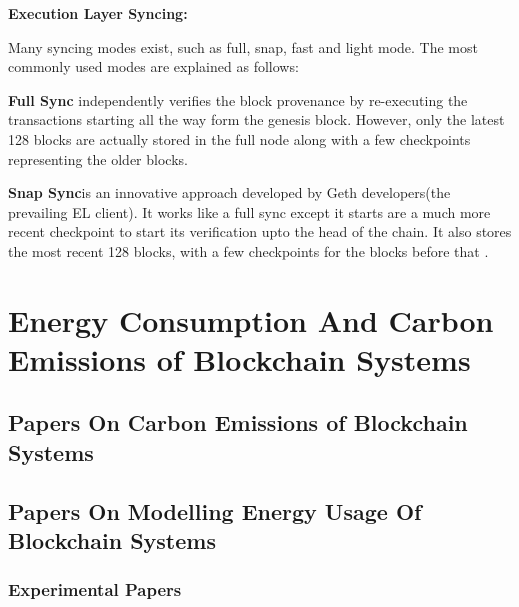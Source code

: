 \textbf{Execution Layer Syncing: } 

Many syncing modes exist, such as full, snap, fast and light mode. The most commonly used modes are explained as follows: 

\textbf{Full Sync } independently verifies the block provenance by re-executing the transactions starting all the way form the genesis block. However, only the latest 128 blocks are actually stored in the full node along with a few checkpoints representing the older blocks. 

\textbf{Snap Sync}is an innovative approach developed by Geth developers(the prevailing EL client). It works like a full sync except it starts are a much more recent checkpoint to start its verification upto the head of the chain. It also stores the most recent 128 blocks, with a few checkpoints for the blocks before that \cite{2022DeveloperGo-ethereum}.





\section{Energy Consumption And Carbon Emissions of Blockchain Systems}




\subsection{Papers On Carbon Emissions of Blockchain Systems}



\subsection{Papers On Modelling Energy Usage Of Blockchain Systems}



\subsubsection{Experimental Papers}



